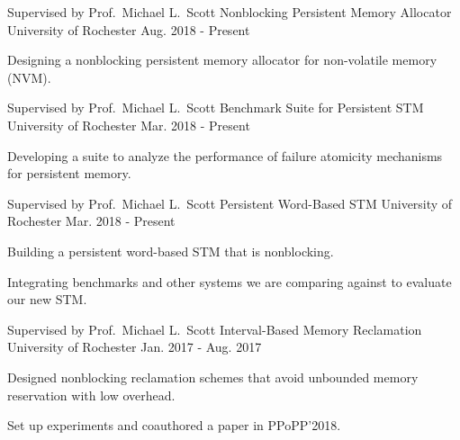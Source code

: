 

\begin{cventries}

  \cventry
    {Supervised by Prof.\ Michael L.\ Scott} %
    {Nonblocking Persistent Memory Allocator} %
    {University of Rochester} %
    {Aug. 2018 - Present} %
    {
      \begin{cvitems} %
        \item {Designing a nonblocking persistent memory allocator for non-volatile memory (NVM).}
      \end{cvitems}
	}

  \cventry
    {Supervised by Prof.\ Michael L.\ Scott} %
    {Benchmark Suite for Persistent STM} %
    {University of Rochester} %
    {Mar. 2018 - Present} %
    {
      \begin{cvitems} %
        \item {Developing a suite to analyze the performance of failure atomicity mechanisms for persistent memory.}
      \end{cvitems}
    }

  \cventry
    {Supervised by Prof.\ Michael L.\ Scott} %
    {Persistent Word-Based STM} %
    {University of Rochester} %
    {Mar. 2018 - Present} %
    {
      \begin{cvitems} %
        \item {Building a persistent word-based STM that is nonblocking.}
        \item {Integrating benchmarks and other systems we are comparing against to evaluate our new STM.}
      \end{cvitems}
    }

  \cventry
    {Supervised by Prof.\ Michael L.\ Scott} %
    {Interval-Based Memory Reclamation} %
    {University of Rochester} %
    {Jan. 2017 - Aug. 2017} %
    {
      \begin{cvitems} %
        \item {Designed nonblocking reclamation schemes that avoid unbounded memory reservation with low overhead.}
        \item {Set up experiments and coauthored a paper in PPoPP'2018.}
      \end{cvitems}
    }


\end{cventries}
